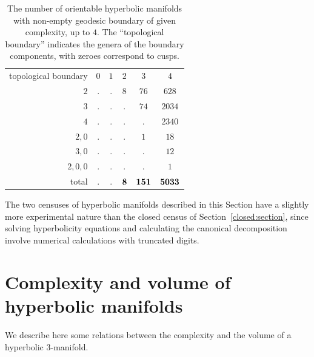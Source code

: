 \documentclass[10pt]{article}      %
\begin{document}
\begin{table}
  \begin{center}
    \begin{tabular}{rccccc}
      topological boundary 
      & $0$ & $1$ & $2$ & $3$ & $4$ \\
      
      $2$ & . & . & $8$ & $76$ & $628$ \\
      
      $3$ & . & . & .    & $74$ & $2034$ \\
      
      $4$ & . & . & .    & .    & $2340$ \\
      
      $2,0$ & . & . & .    & $1$  & $18$ \\
      
      $3,0$ & . & . & .    & .    & $12$ \\
      
      $2,0,0$ & . & . & .    & .    & $1$ \\ 
      
      total   & . & . & $\bf 8$ & $\bf{151}$ & $\bf{5033}$ \\
      
    \end{tabular}
  \end{center}
  \caption{The number of orientable hyperbolic manifolds with non-empty geodesic boundary of
    given complexity, up to $4$. The ``topological boundary'' indicates the genera of the boundary
    components, with zeroes correspond to cusps.}
  \label{geodesic:table}
\end{table}

\begin{remark}
The two censuses of hyperbolic manifolds described in this Section have a slightly more
experimental nature than the closed census of Section~\ref{closed:section},
since solving hyperbolicity equations and calculating the canonical decomposition
involve numerical calculations with truncated digits.
\end{remark}

\section{Complexity and volume of hyperbolic manifolds} \label{complexity:volume:section}
We describe here some relations between the complexity and the volume
of a hyperbolic 3-manifold.
\end{document}
